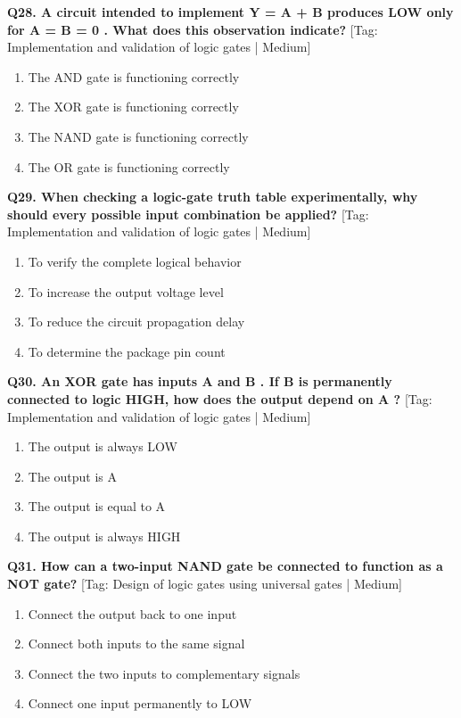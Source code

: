 \noindent\textbf{Q28. A circuit intended to implement Y = A + B produces LOW only for A = B = 0 . What does this observation indicate?} \hfill [Tag: Implementation and validation of logic gates | Medium]
\begin{enumerate}[label=(\alph*),topsep=2pt,itemsep=1pt,partopsep=0pt,parsep=0pt]
    \item {The AND gate is functioning correctly}
    \item {The XOR gate is functioning correctly}
    \item {The NAND gate is functioning correctly}
    \item {The OR gate is functioning correctly}
\end{enumerate}
\vspace{2mm}

\noindent\textbf{Q29. When checking a logic-gate truth table experimentally, why should every possible input combination be applied?} \hfill [Tag: Implementation and validation of logic gates | Medium]
\begin{enumerate}[label=(\alph*),topsep=2pt,itemsep=1pt,partopsep=0pt,parsep=0pt]
    \item {To verify the complete logical behavior}
    \item {To increase the output voltage level}
    \item {To reduce the circuit propagation delay}
    \item {To determine the package pin count}
\end{enumerate}
\vspace{2mm}

\noindent\textbf{Q30. An XOR gate has inputs A and B . If B is permanently connected to logic HIGH, how does the output depend on A ?} \hfill [Tag: Implementation and validation of logic gates | Medium]
\begin{enumerate}[label=(\alph*),topsep=2pt,itemsep=1pt,partopsep=0pt,parsep=0pt]
    \item {The output is always LOW}
    \item {The output is A}
    \item {The output is equal to A}
    \item {The output is always HIGH}
\end{enumerate}
\vspace{2mm}

\noindent\textbf{Q31. How can a two-input NAND gate be connected to function as a NOT gate?} \hfill [Tag: Design of logic gates using universal gates | Medium]
\begin{enumerate}[label=(\alph*),topsep=2pt,itemsep=1pt,partopsep=0pt,parsep=0pt]
    \item {Connect the output back to one input}
    \item {Connect both inputs to the same signal}
    \item {Connect the two inputs to complementary signals}
    \item {Connect one input permanently to LOW}
\end{enumerate}
\vspace{2mm}

